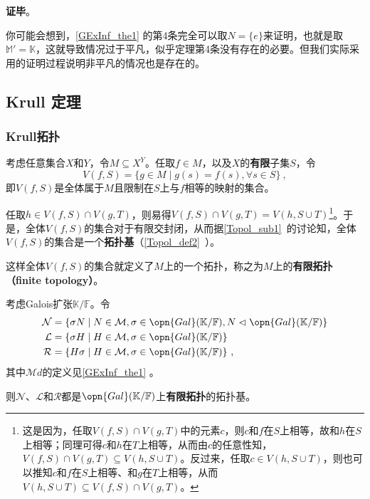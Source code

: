 \textbf{证毕}。

你可能会想到，\autoref{GExInf_the1} 的第4条完全可以取$N=\{e\}$来证明，也就是取$\mathbb{M}'=\mathbb{K}$，这就导致情况过于平凡，似乎定理第4条没有存在的必要。但我们实际采用的证明过程说明非平凡的情况也是存在的。





\subsection{Krull 定理}\label{GExInf_sub1}


\subsubsection{Krull拓扑}

考虑任意集合$X$和$Y$，令$M\subseteq X^Y$。任取$f\in M$，以及$X$的\textbf{有限}子集$S$，令
\begin{equation}
V(f, S) = \{g\in M\mid g(s)=f(s), \forall s\in S\}~,
\end{equation}
即$V(f, S)$是全体属于$M$且限制在$S$上与$f$相等的映射的集合。

任取$h\in V(f, S)\cap V(g, T)$，则易得$V(f, S)\cap V(g, T) = V(h, S\cup T)$\footnote{这是因为，任取$V(f, S)\cap V(g, T)$中的元素$c$，则$c$和$f$在$S$上相等，故和$h$在$S$上相等；同理可得$c$和$h$在$T$上相等，从而由$c$的任意性知，$V(f, S)\cap V(g, T)\subseteq V(h, S\cup T)$。反过来，任取$c\in V(h, S\cup T)$，则也可以推知$c$和$f$在$S$上相等、和$g$在$T$上相等，从而$V(h, S\cup T)\subseteq V(f, S)\cap V(g, T)$。}。于是，全体$V(f, S)$的集合对于有限交封闭，从而据\autoref{Topol_sub1}~的讨论知，全体$V(f, S)$的集合是一个\textbf{拓扑基}（\autoref{Topol_def2}~）。

这样全体$V(f, S)$的集合就定义了$M$上的一个拓扑，称之为$M$上的\textbf{有限拓扑（finite topology）}。



\begin{theorem}{}\label{GExInf_the2}
考虑Galois扩张$\mathbb{K}/\mathbb{F}$。令
\begin{equation}\label{GExInf_eq1}
\begin{aligned}
\mathcal{N} &= \{\sigma N\mid N\in\mathcal{M}, \sigma\in\opn{Gal}(\mathbb{K}/\mathbb{F}), N\vartriangleleft\opn{Gal}(\mathbb{K}/\mathbb{F})\}\\
\mathcal{L} &= \{\sigma H\mid H\in\mathcal{M}, \sigma\in\opn{Gal}(\mathbb{K}/\mathbb{F})\}\\
\mathcal{R} &= \{H\sigma \mid H\in\mathcal{M}, \sigma\in\opn{Gal}(\mathbb{K}/\mathbb{F})\}~,
\end{aligned}
\end{equation}
其中$\mathcal{M}d$的定义见\autoref{GExInf_the1} 。

则$\mathcal{N}$、$\mathcal{L}$和$\mathcal{R}$都是$\opn{Gal}(\mathbb{K}/\mathbb{F})$上\textbf{有限拓扑}的拓扑基。
\end{theorem}

